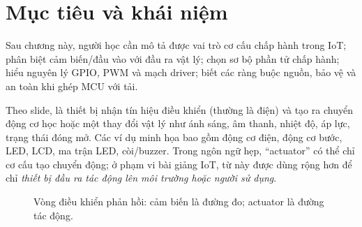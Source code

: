 
\section{Mục tiêu và khái niệm}
Sau chương này, người học cần mô tả được vai trò cơ cấu chấp hành trong IoT; phân biệt cảm biến/đầu vào với đầu ra vật lý; chọn sơ bộ phần tử chấp hành; hiểu nguyên lý GPIO, PWM và mạch driver; biết các ràng buộc nguồn, bảo vệ và an toàn khi ghép MCU với tải.

Theo slide,  là thiết bị nhận tín hiệu điều khiển (thường là điện) và tạo ra chuyển động cơ học hoặc một thay đổi vật lý như ánh sáng, âm thanh, nhiệt độ, áp lực, trạng thái đóng mở. Các ví dụ minh họa bao gồm động cơ điện, động cơ bước, LED, LCD, ma trận LED, còi/buzzer. Trong ngôn ngữ hẹp, ``actuator'' có thể chỉ cơ cấu tạo chuyển động; ở phạm vi bài giảng IoT, từ này được dùng rộng hơn để chỉ \emph{thiết bị đầu ra tác động lên môi trường hoặc người sử dụng}.

\begin{figure}[htbp]\centering
{}
\caption{Vòng điều khiển phản hồi: cảm biến là đường đo; actuator là đường tác động.}
\end{figure}

